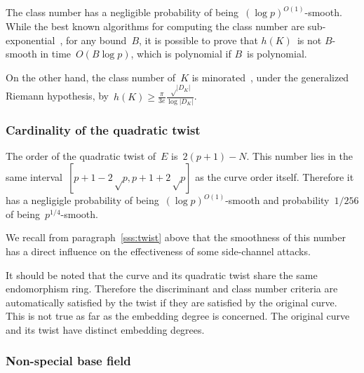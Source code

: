 \documentclass[twocolumn,letterpaper,10pt]{article}
\def\abs#1{\left|#1\right|}
\DeclareMathOperator\Cl{Cl}
\begin{document}
The class number has a negligible probability
of being~$(\log p)^{O(1)}$-smooth.
While the best known algorithms for computing the class number
are sub-exponential~\cite{ams1989hmc,amc2010biasse},
for any bound~$B$,
it is possible to prove that $h(K)$~is not $B$-smooth
in time~$O(B \log p)$,
which is polynomial if $B$~is polynomial.

On the other hand,
the class number of~$K$ is minorated~\cite{cras1990louboutin},
under the generalized Riemann hypothesis,
by~$h(K) ≥ \frac{π}{3e} \frac{√{\abs{D_K}}}{\log \abs{D_K}}$.



\subsubsection{Cardinality of the quadratic twist}
\label{sss:normal-twist}

The order of the quadratic twist of~$E$ is~$2(p+1) - N$.
This number lies in the same interval~$[p+1-2√p, p+1+2√p]$
as the curve order itself.
Therefore it has a negligigle probability of being~$(\log p)^{O(1)}$-smooth
and probability~$1/256$ of being~$p^{1/4}$-smooth.

We recall from paragraph~\ref{sss:twist} above
that the smoothness of this number has a direct influence
on the effectiveness of some side-channel attacks.

It should be noted that the curve and its quadratic twist
share the same endomorphism ring.
Therefore the discriminant and class number criteria
are automatically satisfied by the twist
if they are satisfied by the original curve.
This is not true as far as the embedding degree is concerned.
The original curve and its twist have distinct embedding degrees.

\subsubsection{Non-special base field}
\label{sss:special-anormal}
\end{document}
